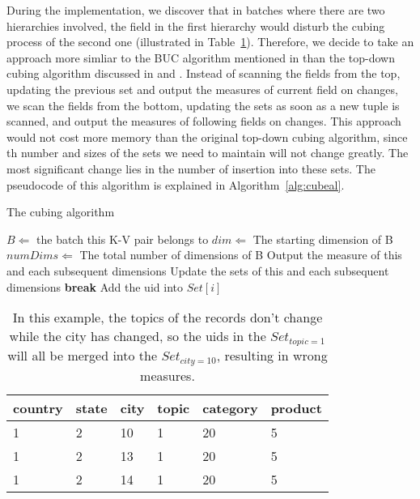 \documentclass{article}
\begin{document}
During the implementation, we discover that in batches where there are two hierarchies involved, the field in the first hierarchy would disturb the cubing process of the second one (illustrated in Table~\ref{table:interrupt}). Therefore, we decide to take an approach more simliar to the BUC algorithm mentioned in \cite{beyer1999bottom} than the top-down cubing algorithm discussed in \cite{agarwal1996computation} and \cite{zhao1997array}. Instead of scanning the fields from the top, updating the previous set and output the measures of current field on changes, we scan the fields from the bottom, updating the sets as soon as a new tuple is scanned, and output the measures of following fields on changes. This approach would not cost more memory than the original top-down cubing algorithm, since th number and sizes of the sets we need to maintain will not change greatly. The most significant change lies in the number of insertion into these sets. The pseudocode of this algorithm is explained in Algorithm~\ref{alg:cubeal}.

\begin{algorithm}[h]
\centering
\caption{The cubing algorithm}
\label{alg:cubeal}
\begin{algorithmic}[1]  
	\State $B \Leftarrow$ the batch this K-V pair belongs to
	\State $dim \Leftarrow$ The starting dimension of B
	\State $numDims \Leftarrow$ The total number of dimensions of B
			\State Output the measure of this and each subsequent dimensions
			\State Update the sets of this and each subsequent dimensions
			\State \textbf{break}
		\Else
			\State Add the uid into $Set[i]$
		\EndIf
	\EndFor
\EndFor   
\end{algorithmic}  
\end{algorithm}

\begin{table}[h]
\centering
\begin{tabular}{l l l l l l}
country & state & city & topic & category & product \\
\hline
1 & 2 & 10 & 1 & 20 & 5 \\
1 & 2 & 13 & 1 & 20 & 5 \\
1 & 2 & 14 & 1 & 20 & 5

\end{tabular}
\caption{In this example, the topics of the records don't change while the city has changed, so the uids in the $Set_{topic=1}$ will all be merged into the $Set_{city=10}$, resulting in wrong measures.}
\label{table:interrupt}
\end{table}
\end{document}
